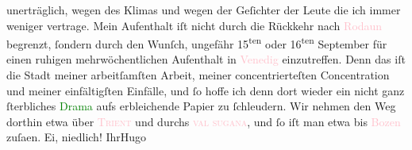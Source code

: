                unerträglich, wegen des Klimas und wegen der Geſichter der Leute die ich immer
               weniger vertrage.\pend
           \pstart
           Mein Aufenthalt iſt nicht durch die Rückkehr nach \textcolor{pink}{Rodaun}{}\ledrightnote{\textcolor{pink}{Rodaun}} begrenzt, ſondern durch den Wunſch, ungefähr {\pb}15\textsuperscript{ten} oder 16\textsuperscript{ten} September für einen
               ruhigen mehrwöchentlichen Aufenthalt in \textcolor{pink}{Venedig}{}\ledrightnote{\textcolor{pink}{Venedig}}
               einzutreffen. Denn das iſt die Stadt meiner arbeitſamſten Arbeit, meiner
               concentrierteſten Concentration und meiner einfältigſten Einfälle, und ſo hoffe ich
               denn dort wieder ein nicht ganz ſterbliches \textcolor{green}{Drama}{} aufs erbleichende Papier zu ſchleudern. Wir nehmen den Weg
               dorthin etwa über \textcolor{pink}{\textsc{Trient}}{}\ledrightnote{\textcolor{pink}{Trient}} und durchs \textcolor{pink}{\textsc{val sugana}}{}\ledrightnote{\textcolor{pink}{Val Sugana}}, und ſo iſt man etwa bis \textcolor{pink}{Bozen}{}\ledrightnote{\textcolor{pink}{Bozen}} zuſa{\geminationm}en. Ei, niedlich!\pend
           \pstart Ihr\spacefill\mbox{Hugo}\pend{}\endnumbering{}  
      